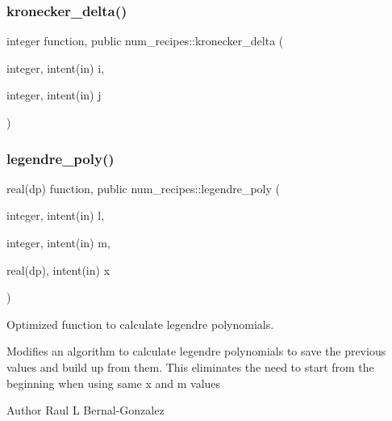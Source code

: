\subsubsection{\texorpdfstring{kronecker\+\_\+delta()}{kronecker\_delta()}}
{\footnotesize\ttfamily integer function, public num\+\_\+recipes\+::kronecker\+\_\+delta (\begin{DoxyParamCaption}\item[{integer, intent(in)}]{i,  }\item[{integer, intent(in)}]{j }\end{DoxyParamCaption})}

\mbox{\label{namespacenum__recipes_abb39707356349ecadb66e01014f12520}} 
\subsubsection{\texorpdfstring{legendre\+\_\+poly()}{legendre\_poly()}}
{\footnotesize\ttfamily real(dp) function, public num\+\_\+recipes\+::legendre\+\_\+poly (\begin{DoxyParamCaption}\item[{integer, intent(in)}]{l,  }\item[{integer, intent(in)}]{m,  }\item[{real(dp), intent(in)}]{x }\end{DoxyParamCaption})}



Optimized function to calculate legendre polynomials. 

Modifies an algorithm to calculate legendre polynomials to save the previous values and build up from them. This eliminates the need to start from the beginning when using same x and m values

\begin{DoxyAuthor}{Author}
Raul L Bernal-\/\+Gonzalez 
\end{DoxyAuthor}
\mbox{\label{namespacenum__recipes_a1dfc128c6203c9e7bede17caa5fbb828}} 
